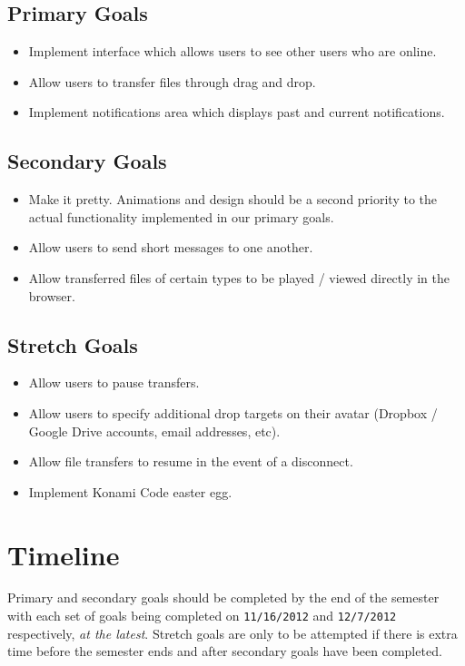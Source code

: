 \documentclass[letterpaper, 10pt]{article}
\begin{document}
	\subsection{Primary Goals}
	\begin{itemize}
		\item Implement interface which allows users to see other users who are online.
		\item Allow users to transfer files through drag and drop.
		\item Implement notifications area which displays past and current notifications.
	\end{itemize}

	\subsection{Secondary Goals}
	\begin{itemize}
		\item Make it pretty. Animations and design should be a second priority to the actual functionality implemented in our primary goals.
		\item Allow users to send short messages to one another.
		\item Allow transferred files of certain types to be played / viewed directly in the browser.
	\end{itemize}

	\subsection{Stretch Goals}
	\begin{itemize}
		\item Allow users to pause transfers.
		\item Allow users to specify additional drop targets on their avatar (Dropbox / Google Drive accounts, email addresses, etc).
		\item Allow file transfers to resume in the event of a disconnect.
		\item Implement Konami Code easter egg.
	\end{itemize}

	\section{Timeline}
	Primary and secondary goals should be completed by the end of the semester with each set of goals being completed on \texttt{11/16/2012} and \texttt{12/7/2012} respectively, \emph{at the latest}. Stretch goals are only to be attempted if there is extra time before the semester ends and after secondary goals have been completed.
\end{document}
